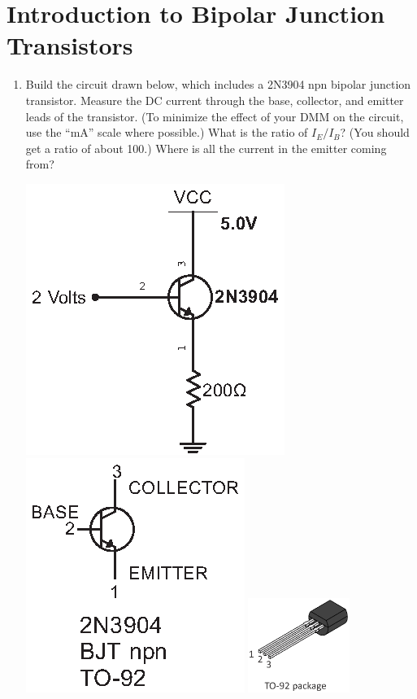 \section{Introduction to Bipolar Junction Transistors}
\label{lab_bjt}


\bigskip

\begin{enumerate}[wide]

\item Build the circuit drawn below, which includes a 2N3904 npn bipolar junction transistor.  Measure the DC current through the base, collector, and emitter leads of the transistor.  (To minimize the effect of your DMM on the circuit, use the ``mA'' scale where possible.)  What is the ratio of $I_E/I_B$?  (You should get a ratio of about 100.)  Where is all the current in the emitter coming from?
\begin{center}
\includegraphics{bjt/first_bjt_test_circuit.eps}
\includegraphics{appendices/pinouts/2N3904_pinout.eps}
\includegraphics[width=1.3in]{appendices/pinouts/TO-92_package_pinout.eps}
\end{center}


\end{enumerate}
